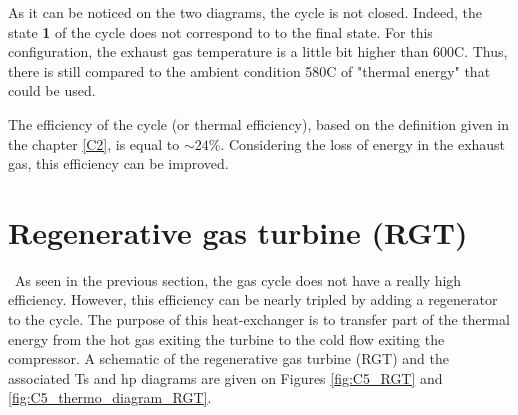 As it can be noticed on the two diagrams, the cycle is not closed. Indeed, the state \textbf{1} of the cycle does not correspond to to the final state. For this configuration, the exhaust gas temperature is a little bit higher than 600\degree C. Thus, there is still compared to the ambient condition 580\degree C of "thermal energy" that could be used.

The efficiency of the cycle (or thermal efficiency), based on the definition given in the chapter \ref{C2}, is equal to $\sim 24$\%. Considering the loss of energy in the exhaust gas, this efficiency can be improved.

\section{Regenerative gas turbine (RGT)}
\quad\, As seen in the previous section, the gas cycle does not have a really high efficiency. However, this efficiency can be nearly tripled by adding a regenerator to the cycle. The purpose of this heat-exchanger is to transfer part of the thermal energy from the hot gas exiting the turbine to the cold flow exiting the compressor. A schematic of the regenerative gas turbine (RGT) and the associated Ts and hp diagrams are given on Figures \ref{fig:C5_RGT} and \ref{fig:C5_thermo_diagram_RGT}. 

